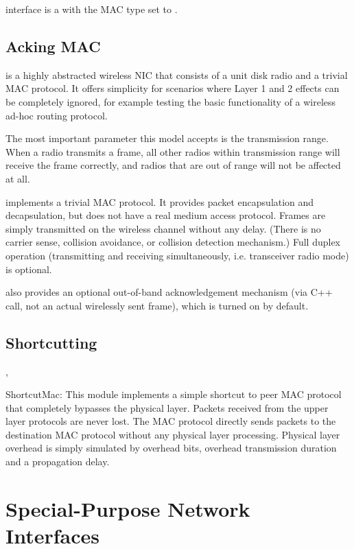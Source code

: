  interface is a  with
the MAC type set to . 

\subsection{Acking MAC}

 is a highly abstracted wireless
NIC that consists of a unit disk radio and a trivial MAC protocol. It offers
simplicity for scenarios where Layer 1 and 2 effects can be completely ignored, 
for example testing the basic functionality of a wireless ad-hoc routing protocol.

The most important parameter this model accepts is the transmission range.
When a radio transmits a frame, all other radios within transmission range
will receive the frame correctly, and radios that are out of range will not be
affected at all.

 implements a trivial MAC protocol. It provides packet
encapsulation and decapsulation, but does not have a real medium access
protocol. Frames are simply transmitted on the wireless channel without any
delay. (There is no carrier sense, collision avoidance, or collision detection
mechanism.) Full duplex operation (transmitting and receiving
simultaneously, i.e. transceiver radio mode) is optional. 

 also provides an optional out-of-band acknowledgement
mechanism (via C++ call, not an actual wirelessly sent frame), which is turned
on by default.




\subsection{Shortcutting}

, 

ShortcutMac: This module implements a simple shortcut to peer MAC protocol that
completely bypasses the physical layer. Packets received from the upper layer protocols
are never lost. The MAC protocol directly sends packets to the destination
MAC protocol without any physical layer processing. Physical layer overhead
is simply simulated by overhead bits, overhead transmission duration and
a propagation delay.



\section{Special-Purpose Network Interfaces}

